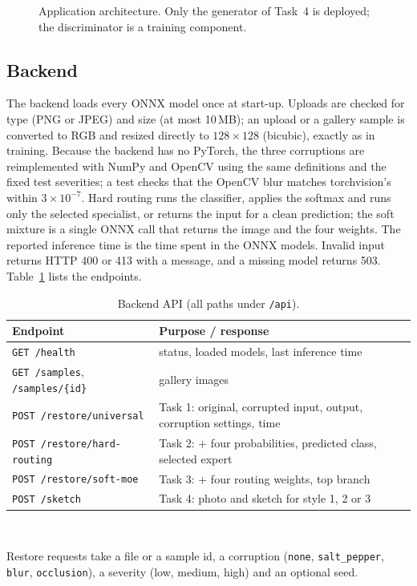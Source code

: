 \documentclass[conference]{IEEEtran}
\begin{document}
\begin{figure}[t]
\centering

\caption{Application architecture. Only the generator of Task~4 is deployed;
the discriminator is a training component.}
\label{fig:app_arch}
\end{figure}

\subsection{Backend}
The backend loads every ONNX model once at start-up. Uploads are checked
for type (PNG or JPEG) and size (at most 10\,MB); an upload or a gallery
sample is converted to RGB and resized directly to $128\times128$ (bicubic),
exactly as in training. Because the backend has no PyTorch, the three
corruptions are reimplemented with NumPy and OpenCV using the same
definitions and the fixed test severities; a test checks that the OpenCV blur
matches torchvision's within $3\times10^{-7}$. Hard routing runs the
classifier, applies the softmax and runs only the selected specialist, or
returns the input for a clean prediction; the soft mixture is a single ONNX
call that returns the image and the four weights. The reported inference
time is the time spent in the ONNX models. Invalid input returns HTTP 400 or
413 with a message, and a missing model returns 503. Table~\ref{tab:api}
lists the endpoints.

\begin{table}[t]
\centering
\caption{Backend API (all paths under \texttt{/api}).}
\label{tab:api}
\scriptsize
\begin{tabular}{@{}lp{}@{}}
\toprule
Endpoint & Purpose / response \\
\midrule
\texttt{GET /health} & status, loaded models, last inference time \\
\texttt{GET /samples}, \texttt{/samples/\{id\}} & gallery images \\
\texttt{POST /restore/universal} & Task 1: original, corrupted input, output, corruption settings, time \\
\texttt{POST /restore/hard-routing} & Task 2: + four probabilities, predicted class, selected expert \\
\texttt{POST /restore/soft-moe} & Task 3: + four routing weights, top branch \\
\texttt{POST /sketch} & Task 4: photo and sketch for style 1, 2 or 3 \\
\bottomrule
\end{tabular}
\\[3pt]
\parbox{\columnwidth}{\footnotesize Restore requests take a file or a
sample id, a corruption (\texttt{none}, \texttt{salt\_pepper},
\texttt{blur}, \texttt{occlusion}), a severity (low, medium, high) and an
optional seed.}
\end{table}
\end{document}
